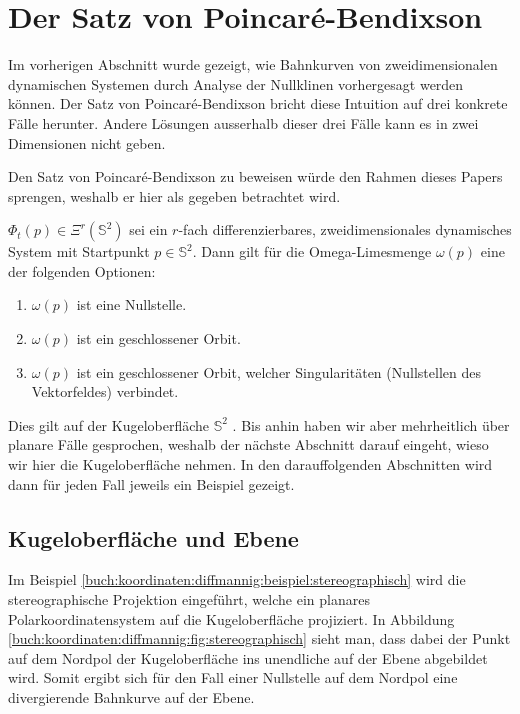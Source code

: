 \section{Der Satz von Poincaré-Bendixson} \label{poinbendix:section:poinbendix}

Im vorherigen Abschnitt wurde gezeigt, wie Bahnkurven von zweidimensionalen dynamischen Systemen durch Analyse der Nullklinen vorhergesagt werden können.
Der Satz von Poincaré-Bendixson bricht diese Intuition auf drei konkrete Fälle herunter.
Andere Lösungen ausserhalb dieser drei Fälle kann es in zwei Dimensionen nicht geben.

Den Satz von Poincaré-Bendixson zu beweisen würde den Rahmen dieses Papers sprengen, weshalb er hier als gegeben betrachtet wird.


\begin{satz}
\label{poinbendix:satz:poinbendix}
$\Phi_t(p) \in \Xi^r(\mathbb{S}^2)$ sei ein $r$-fach differenzierbares, zweidimensionales dynamisches System mit Startpunkt $p \in \mathbb{S}^2$.
Dann gilt für die Omega-Limesmenge $\omega(p)$ eine der folgenden Optionen:
\begin{enumerate}
\item $\omega(p)$ ist eine Nullstelle.
\item $\omega(p)$ ist ein geschlossener Orbit.
\item $\omega(p)$ ist ein geschlossener Orbit, welcher Singularitäten (Nullstellen des Vektorfeldes) verbindet.
\end{enumerate}
\end{satz}

Dies gilt auf der Kugeloberfläche $\mathbb{S}^2$ \cite{poinbendix:melo}.
Bis anhin haben wir aber mehrheitlich über planare Fälle gesprochen, weshalb der nächste Abschnitt darauf eingeht, wieso wir hier die Kugeloberfläche nehmen.
In den darauffolgenden Abschnitten wird dann für jeden Fall jeweils ein Beispiel gezeigt.

\subsection{Kugeloberfläche und Ebene} \label{poinbendix:subsection:kugeloberflaeche}

Im Beispiel \ref{buch:koordinaten:diffmannig:beispiel:stereographisch} wird die stereographische Projektion eingeführt, welche ein planares Polarkoordinatensystem auf die Kugeloberfläche projiziert.
%
In Abbildung \ref{buch:koordinaten:diffmannig:fig:stereographisch} sieht man, dass dabei der Punkt auf dem Nordpol der Kugeloberfläche ins unendliche auf der Ebene abgebildet wird.
Somit ergibt sich für den Fall einer Nullstelle auf dem Nordpol eine divergierende Bahnkurve auf der Ebene.

